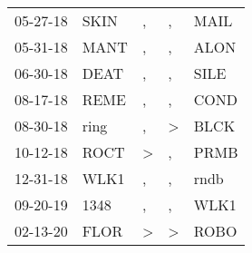 \begin{supertabular}{p{0.07\textwidth}p{0.06\textwidth}p{0.02\textwidth}p{0.02\textwidth}p{0.06\textwidth}}
 05-27-18\textsuperscript{} &  SKIN\textsuperscript{} &             , &             , &  MAIL\textsuperscript{} \\
 05-31-18\textsuperscript{} &  MANT\textsuperscript{} &             , &             , &  ALON\textsuperscript{} \\
 06-30-18\textsuperscript{} &  DEAT\textsuperscript{} &             , &             , &  SILE\textsuperscript{} \\
 08-17-18\textsuperscript{} &  REME\textsuperscript{} &             , &             , &  COND\textsuperscript{} \\
 08-30-18\textsuperscript{} &  ring\textsuperscript{} &             , &  \textgreater &  BLCK\textsuperscript{} \\
 10-12-18\textsuperscript{} &  ROCT\textsuperscript{} &  \textgreater &             , &  PRMB\textsuperscript{} \\
 12-31-18\textsuperscript{} &  WLK1\textsuperscript{} &             , &             , &  rndb\textsuperscript{} \\
 09-20-19\textsuperscript{} &  1348\textsuperscript{} &             , &             , &  WLK1\textsuperscript{} \\
 02-13-20\textsuperscript{} &  FLOR\textsuperscript{} &  \textgreater &  \textgreater &  ROBO\textsuperscript{} \\
\end{supertabular}
